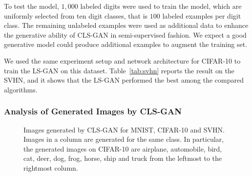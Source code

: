 \documentclass[11pt,fullpage, letterpaper,twoside]{article}
\newcommand{\1}[1]{\mathds{1}_{\left[#1\right]}}
\begin{document}
To test the model, $1,000$ labeled digits were used to train the model, which are uniformly selected from ten digit classes, that is $100$ labeled examples per digit class. The remaining unlabeled examples were used as additional data to enhance the generative ability of CLS-GAN in semi-supervised fashion.
We expect a good generative model could produce additional examples to augment the training set.

We used the same experiment setup and network architecture for CIFAR-10 to train the LS-GAN on this dataset.  Table~\ref{tab:svhn} reports the result on the SVHN, and it shows that the LS-GAN performed the best among the compared algorithms.



\subsubsection{Analysis of Generated Images by CLS-GAN}

\begin{figure*}[t]
\centering
{}\hspace{4mm}
\hspace{4mm}
\caption{Images generated by CLS-GAN for MNIST, CIFAR-10 and SVHN. Images in a column are generated for the same class. In particular, the generated images on CIFAR-10 are airplane, automobile, bird, cat, deer, dog, frog, horse, ship and truck from the leftmost to the rightmost column.}\label{fig:generation}
\label{Fig:dRNN}
\end{figure*}
\end{document}
